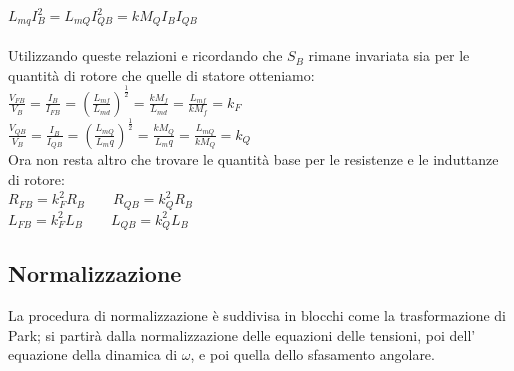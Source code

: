\documentclass[Lau,noexaminfo]{sapthesis}
\begin{document}
	 $L_{mq}I_B^2=L_{mQ}I_{QB}^2=kM_QI_BI_{QB}$\\\\
	 Utilizzando queste relazioni e ricordando che $S_B$ rimane invariata sia per le quantità di rotore che quelle di statore otteniamo:\\
	 $\frac{V_{FB}}{V_B}=\frac{I_B}{I_{FB}}=(\frac{L_{mf}}{L_{md}})^{\frac{1}{2}}=\frac{kM_f}{L_{md}}=\frac{L_{mf}}{kM_f}=k_F$\\
	 $\frac{V_{QB}}{V_B}=\frac{I_B}{I_{QB}}=(\frac{L_{mQ}}{L_mq})^\frac{1}{2}=\frac{kM_Q}{L_mq}=\frac{L_{mQ}}{kM_Q}=k_Q$\\
	 Ora non resta altro che trovare le quantità base per le resistenze e le induttanze di rotore:\\
	 $R_{FB}=k_F^2 R_B \qquad R_{QB}=k_Q^2 R_B$\\
	 $L_{FB}=k_F^2 L_B \qquad L_{QB}=k_Q^2 L_B$\\
	 \subsection{Normalizzazione}
	 La procedura di normalizzazione è suddivisa in blocchi come la trasformazione di Park; si partirà dalla normalizzazione delle equazioni delle tensioni, poi dell' equazione della dinamica di $\omega$, e poi quella dello sfasamento angolare.
\end{document}
